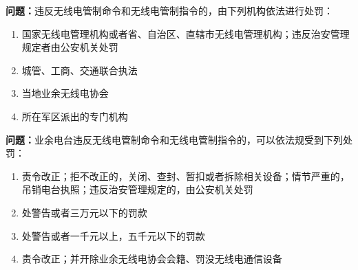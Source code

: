 \textbf{问题：}违反无线电管制命令和无线电管制指令的，由下列机构依法进行处罚：
\begin{enumerate}[label=\Alph*), leftmargin=1cm]
	\item 国家无线电管理机构或者省、自治区、直辖市无线电管理机构；违反治安管理规定者由公安机关处罚
	\item 城管、工商、交通联合执法
	\item 当地业余无线电协会
	\item 所在军区派出的专门机构
\end{enumerate}

\textbf{问题：}业余电台违反无线电管制命令和无线电管制指令的，可以依法规受到下列处罚：
\begin{enumerate}[label=\Alph*), leftmargin=1cm]
	\item  责令改正；拒不改正的，关闭、查封、暂扣或者拆除相关设备；情节严重的，吊销电台执照；违反治安管理规定的，由公安机关处罚
	\item  处警告或者三万元以下的罚款
	\item  处警告或者一千元以上，五千元以下的罚款
	\item  责令改正；并开除业余无线电协会会籍、罚没无线电通信设备
\end{enumerate}

